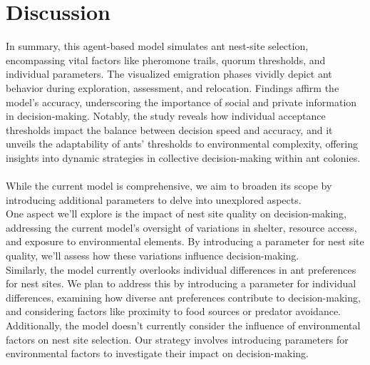 \documentclass{article}
\begin{document}
\section{Discussion}
In summary, this agent-based model simulates ant nest-site selection, encompassing vital factors like pheromone trails, quorum thresholds, and individual parameters. The visualized emigration phases vividly depict ant behavior during exploration, assessment, and relocation. Findings affirm the model's accuracy, underscoring the importance of social and private information in decision-making. Notably, the study reveals how individual acceptance thresholds impact the balance between decision speed and accuracy, and it unveils the adaptability of ants' thresholds to environmental complexity, offering insights into dynamic strategies in collective decision-making within ant colonies.\\
\\
While the current model is comprehensive, we aim to broaden its scope by introducing additional parameters to delve into unexplored aspects.\\
One aspect we'll explore is the impact of nest site quality on decision-making, addressing the current model's oversight of variations in shelter, resource access, and exposure to environmental elements. By introducing a parameter for nest site quality, we'll assess how these variations influence decision-making.\\
Similarly, the model currently overlooks individual differences in ant preferences for nest sites. We plan to address this by introducing a parameter for individual differences, examining how diverse ant preferences contribute to decision-making, and considering factors like proximity to food sources or predator avoidance.\\
Additionally, the model doesn't currently consider the influence of environmental factors on nest site selection. Our strategy involves introducing parameters for environmental factors to investigate their impact on decision-making.

 


\end{document}
